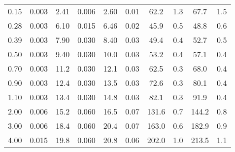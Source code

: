\begin{tabular}{cccccccccc}
0.15       & 0.003           & 2.41        &    0.006       & 2.60          &    0.01                & 62.2          & 1.3            & 67.7          & 1.5                      \\                                                                  
0.28       & 0.003           & 6.10        &    0.015       & 6.46          &    0.02                & 45.9          & 0.5            & 48.8          & 0.6                      \\                                                                  
0.39       & 0.003           & 7.90        &    0.030       & 8.40          &    0.03                & 49.4          & 0.4            & 52.7          & 0.5                      \\                                                                  
0.50       & 0.003           & 9.40        &    0.030       & 10.0          &    0.03                & 53.2          & 0.4            & 57.1          & 0.4                      \\                                                                  
0.70       & 0.003           & 11.2        &    0.030       & 12.1          &    0.03                & 62.5          & 0.3            & 68.0          & 0.4                      \\                                                                  
0.90       & 0.003           & 12.4        &    0.030       & 13.5          &    0.03                & 72.6          & 0.3            & 80.1          & 0.4                      \\                                                                  
1.10       & 0.003           & 13.4        &    0.030       & 14.8          &    0.03                & 82.1          & 0.3            & 91.9          & 0.4                      \\                                                                  
2.00       & 0.006           & 15.2        &    0.060       & 16.5          &    0.07                & 131.6         & 0.7            & 144.2         & 0.8                      \\                                                                  
3.00       & 0.006           & 18.4        &    0.060       & 20.4          &    0.07                & 163.0         & 0.6            & 182.9         & 0.9                      \\                                                                  
4.00       & 0.015           & 19.8        &    0.060       & 20.8          &    0.06                & 202.0         & 1.0            & 213.5         & 1.1                      \\                                                                  

\end{tabular}
